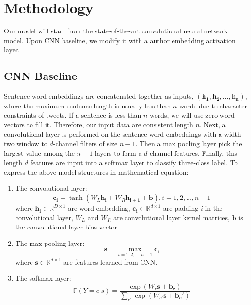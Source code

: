 \newcommand{\R}{\mathbb{R}}
\section{Methodology}
\label{Sec:methodology}


Our model will start from the state-of-the-art convolutional neural network model. Upon CNN baseline, we modify it with a author embedding activation layer. 
\subsection*{CNN Baseline}
Sentence word embeddings are concatenated together as inputs, $(\mathbf{h_1},\mathbf{h_2},\ldots,\mathbf{h_n})$, where the maximum sentence length is usually less than $n$ words due to character constraints of tweets. If a sentence is less than $n$ words, we will use zero word vectors to fill it. Therefore, our input data are consistent length $n$. Next, a convolutional layer is performed on the sentence word embeddings with a width-two window to $d$-channel filters of size $n-1$. Then a max pooling layer pick the largest value among the $n-1$ layers to form a $d$-channel features. Finally, this length $d$ features are input into a softmax layer to classify three-class label. To express the above model structures in mathematical equation:
\begin{enumerate}
	\item The convolutional layer:
\begin{equation}
	\mathbf{c_i} = \tanh(W_L\mathbf{h_i} + W_R \mathbf{h_{i+1}} + \mathbf{b}), i=1,2,\ldots,n-1
\end{equation}
where $\mathbf{h_i}\in \R^{D\times1}$ are word embedding, $\mathbf{c_i} \in \R^{d\times1}$ are padding $i$ in the convolutional layer, $W_L$ and $W_R$ are convolutional layer kernel matrices, $\mathbf{b}$ is the convolutional layer bias vector.
\item The max pooling layer:
\begin{equation}
	\mathbf{s} = \max_{i=1,2,\ldots,n-1}\mathbf{c_i}
\end{equation}
where $\mathbf{s} \in \R^{d \times 1}$ are features learned from CNN.
\item The softmax layer:
\begin{equation}
	\mathbb{P}(Y=c|s)=\frac{\exp(W_{c}\mathbf{s}+\mathbf{b_c})}{\sum_{c'}\exp(W_{c'}\mathbf{s}+\mathbf{b_c'})}
\end{equation}
\end{enumerate}

